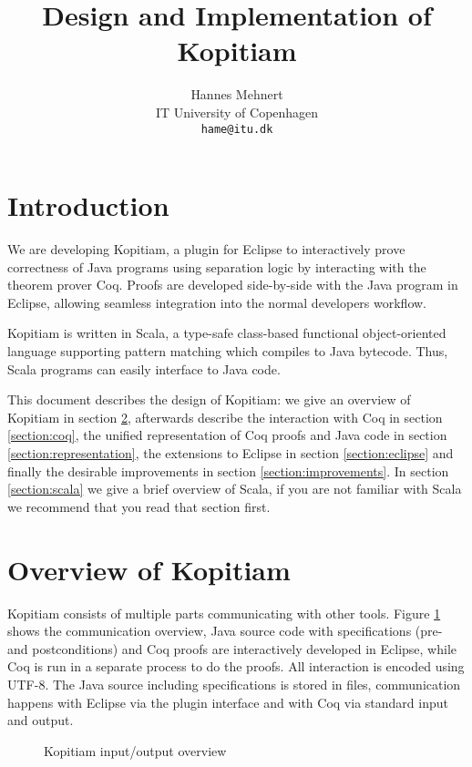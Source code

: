 \documentclass{article}
\author{Hannes Mehnert\\IT University of Copenhagen\\\texttt{hame@itu.dk}}
\title{Design and Implementation of Kopitiam}
\begin{document}
\maketitle

\section{Introduction}
We are developing Kopitiam, a plugin for Eclipse to interactively prove correctness of Java programs using separation logic by interacting with the theorem prover Coq. Proofs are developed side-by-side with the Java program in Eclipse, allowing seamless integration into the normal developers workflow.

Kopitiam is written in Scala, a type-safe class-based functional object-oriented language supporting pattern matching which compiles to Java bytecode. Thus, Scala programs can easily interface to Java code.

This document describes the design of Kopitiam: we give an overview of Kopitiam in section \ref{section:overview}, afterwards describe the interaction with Coq in section \ref{section:coq}, the unified representation of Coq proofs and Java code in section \ref{section:representation}, the extensions to Eclipse in section \ref{section:eclipse} and finally the desirable improvements in section \ref{section:improvements}. In section \ref{section:scala} we give a brief overview of Scala, if you are not familiar with Scala we recommend that you read that section first.

\section{Overview of Kopitiam} \label{section:overview}
Kopitiam consists of multiple parts communicating with other tools. Figure \ref{fig:kop-over} shows the communication overview, Java source code with specifications (pre- and postconditions) and Coq proofs are interactively developed in Eclipse, while Coq is run in a separate process to do the proofs. All interaction is encoded using UTF-8. The Java source including specifications is stored in files, communication happens with Eclipse via the plugin interface and with Coq via standard input and output.

\begin{figure}
\centering
{}
\caption{Kopitiam input/output overview}
\label{fig:kop-over}
\end{figure}
\end{document}
